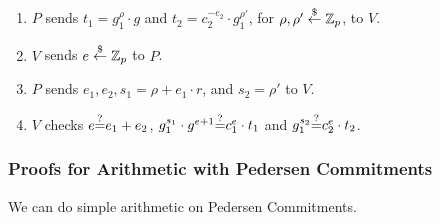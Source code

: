 \begin{enumerate}
\item $P$ sends $t_1=g_1^\rho\cdot{}g$ and
  $t_2=c_2^{-e_2}\cdot{}g_1^{\rho'}$, for $\rho,\rho'\stackrel{\$}{\leftarrow}\mathbb{Z}_p$, to
  $V$.
\item $V$ sends $e\stackrel{\$}{\leftarrow}\mathbb{Z}_p$ to $P$.
  \item $P$ sends $e_1,e_2,s_1=\rho+e_1\cdot{}r$, and $s_2=\rho'$ to $V$.

\item $V$ checks $e{\stackrel{?}{=}}{}e_1+e_2$, $g_1^{s_1}\cdot{}g^{e+1}{\stackrel{?}{=}}{}c_1^e\cdot{}t_1$ and $g_1^{s_2}{\stackrel{?}{=}}{}c_2^e\cdot{}t_2$.
\end{enumerate}

\subsubsection{Proofs for Arithmetic with Pedersen Commitments}
We can do simple arithmetic on Pedersen Commitments.
